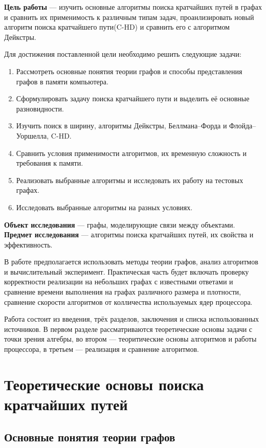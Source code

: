 \documentclass[14pt,a4paper]{extarticle}
\begin{document}
\textbf{Цель работы} --- изучить основные алгоритмы поиска кратчайших путей
в графах и сравнить их применимость к различным типам задач, проанлизировать
новый алгоритм поиска кратчайшего пути(C-HD) и сравнить его с алгоритмом Дейкстры.

Для достижения поставленной цели необходимо решить следующие задачи:
\begin{enumerate}
    \item Рассмотреть основные понятия теории графов и способы представления
    графов в памяти компьютера.
    \item Сформулировать задачу поиска кратчайшего пути и выделить её
    основные разновидности.
    \item Изучить поиск в ширину, алгоритмы Дейкстры, Беллмана--Форда
    и Флойда--Уоршелла, C-HD.
    \item Сравнить условия применимости алгоритмов, их временную сложность
    и требования к памяти.
    \item Реализовать выбранные алгоритмы и исследовать их работу на
    тестовых графах.
    \item Исследовать выбранные алгоритмы на разных условиях.
\end{enumerate}

\textbf{Объект исследования} --- графы, моделирующие связи между объектами. \\
\textbf{Предмет исследования} --- алгоритмы поиска кратчайших путей,
их свойства и эффективность.

В работе предполагается использовать методы теории графов, анализ
алгоритмов и вычислительный эксперимент. Практическая часть будет включать
проверку корректности реализации на небольших графах с известными ответами
и сравнение времени выполнения на графах различного размера и плотности, сравнение
скорости алгоритмов от колличества используемых ядер процессора.

Работа состоит из введения, трёх разделов, заключения и списка использованных
источников. В первом разделе рассматриваются теоретические основы задачи с точки зрения алгебры,
во втором --- теоритические основы алгоритмов и работы процессора, в третьем --- реализация и сравнение
алгоритмов.

\newpage
\section{Теоретические основы поиска кратчайших путей}

\subsection{Основные понятия теории графов}
\end{document}
